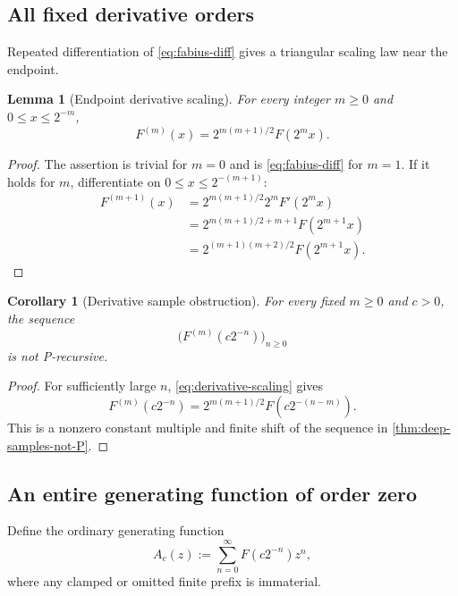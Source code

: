 \documentclass[11pt]{article}
\numberwithin{equation}{section}
\newtheorem{lemma}[theorem]{Lemma}
\newtheorem{corollary}[theorem]{Corollary}
\theoremstyle{definition}
\theoremstyle{remark}
\begin{document}
\subsection{All fixed derivative orders}

Repeated differentiation of \eqref{eq:fabius-diff} gives a triangular scaling
law near the endpoint.

\begin{lemma}[Endpoint derivative scaling]
\label{lem:derivative-scaling}
For every integer $m\ge0$ and $0\le x\le2^{-m}$,
\begin{equation}
 F^{(m)}(x)=2^{m(m+1)/2}F(2^mx).
 \label{eq:derivative-scaling}
\end{equation}
\end{lemma}
\begin{proof}
The assertion is trivial for $m=0$ and is \eqref{eq:fabius-diff} for $m=1$.
If it holds for $m$, differentiate on $0\le x\le2^{-(m+1)}$:
\begin{align*}
 F^{(m+1)}(x)
 &=2^{m(m+1)/2}2^mF'(2^mx)\\
 &=2^{m(m+1)/2+m+1}F(2^{m+1}x)\\
 &=2^{(m+1)(m+2)/2}F(2^{m+1}x).
\end{align*}
\end{proof}

\begin{corollary}[Derivative sample obstruction]
\label{cor:derivative-samples-not-P}
For every fixed $m\ge0$ and $c>0$, the sequence
\begin{equation}
 \bigl(F^{(m)}(c2^{-n})\bigr)_{n\ge0}
 \label{eq:derivative-sample-sequence}
\end{equation}
is not P-recursive.
\end{corollary}
\begin{proof}
For sufficiently large $n$, \eqref{eq:derivative-scaling} gives
\[
 F^{(m)}(c2^{-n})=2^{m(m+1)/2}F(c2^{-(n-m)}).
\]
This is a nonzero constant multiple and finite shift of the sequence in
\cref{thm:deep-samples-not-P}.
\end{proof}

\subsection{An entire generating function of order zero}

Define the ordinary generating function
\begin{equation}
 A_c(z):=\sum_{n=0}^{\infty}F(c2^{-n})z^n,
 \label{eq:sample-OGF}
\end{equation}
where any clamped or omitted finite prefix is immaterial.
\end{document}
